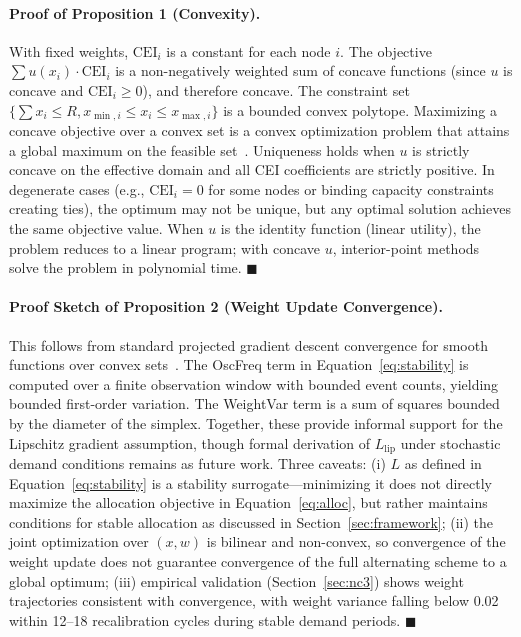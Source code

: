 \documentclass[runningheads]{llncs}
\begin{document}
\paragraph{Proof of Proposition 1 (Convexity).} With fixed weights, $\text{CEI}_i$ is a constant for each node $i$. The objective $\sum u(x_i) \cdot \text{CEI}_i$ is a non-negatively weighted sum of concave functions (since $u$ is concave and $\text{CEI}_i \geq 0$), and therefore concave. The constraint set $\{\sum x_i \leq R, x_{\min,i} \leq x_i \leq x_{\max,i}\}$ is a bounded convex polytope. Maximizing a concave objective over a convex set is a convex optimization problem that attains a global maximum on the feasible set~\cite{boyd}. Uniqueness holds when $u$ is strictly concave on the effective domain and all CEI coefficients are strictly positive. In degenerate cases (e.g., $\text{CEI}_i = 0$ for some nodes or binding capacity constraints creating ties), the optimum may not be unique, but any optimal solution achieves the same objective value. When $u$ is the identity function (linear utility), the problem reduces to a linear program; with concave $u$, interior-point methods solve the problem in polynomial time. $\blacksquare$

\paragraph{Proof Sketch of Proposition 2 (Weight Update Convergence).} This follows from standard projected gradient descent convergence for smooth functions over convex sets~\cite{boyd}. The OscFreq term in Equation~\ref{eq:stability} is computed over a finite observation window with bounded event counts, yielding bounded first-order variation. The WeightVar term is a sum of squares bounded by the diameter of the simplex. Together, these provide informal support for the Lipschitz gradient assumption, though formal derivation of $L_{\text{lip}}$ under stochastic demand conditions remains as future work. Three caveats: (i) $L$ as defined in Equation~\ref{eq:stability} is a stability surrogate---minimizing it does not directly maximize the allocation objective in Equation~\ref{eq:alloc}, but rather maintains conditions for stable allocation as discussed in Section~\ref{sec:framework}; (ii) the joint optimization over $(x, w)$ is bilinear and non-convex, so convergence of the weight update does not guarantee convergence of the full alternating scheme to a global optimum; (iii) empirical validation (Section~\ref{sec:nc3}) shows weight trajectories consistent with convergence, with weight variance falling below 0.02 within 12--18 recalibration cycles during stable demand periods. $\blacksquare$
\end{document}
